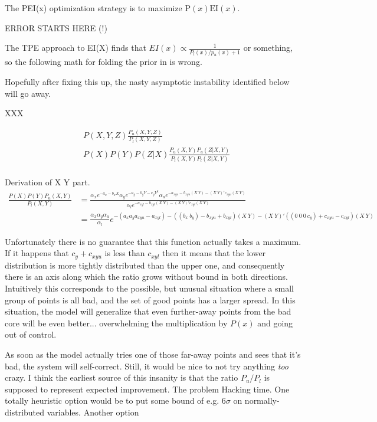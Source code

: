 \documentclass{article}
\begin{document}
The PEI(x) optimization strategy is to maximize $\mathrm{P}(x) \mathrm{EI}(x)$.

ERROR STARTS HERE (!)

The TPE approach to EI(X) finds that $EI(x) \propto \frac{1}{P_l(x)/p_u(x) + 1}$ or something,
so the following math for folding the prior in is wrong.

Hopefully after fixing this up, the nasty asymptotic instability identified below will go away.

XXX

\begin{align}
    & P(X, Y, Z)\frac{P_u(X, Y, Z)}{P_l(X, Y, Z)}\\
    & P(X) P(Y) P(Z|X) \frac{P_u(X, Y) P_u(Z|X, Y)}{P_l(X, Y) P_l(Z|X, Y)} \\
\end{align}

Derivation of X Y part.
\begin{align}
    \frac{P(X) P(Y) P_u(X, Y)}{P_l(X, Y)}
    &= \frac{
        \alpha_{x} e^{-a_{x} - b_{x}X}
        \alpha_{y} e^{-a_{y} - b_{y}Y - c_{y}Y^2}
        \alpha_u e^{ -a_{xyu} -b_{xyu} (X~Y) -(X~Y)'c_{xyu}(X~Y)}
    }{
        \alpha_l e^{ -a_{xyl} -b_{xyl} (X~Y) -(X~Y)'c_{xyl}(X~Y)}
    } \\
    &= \frac{ \alpha_{x} \alpha_{y} \alpha_u }{ \alpha_l }
    e^{ - (a_{x} a_{y} a_{xyu} -a_{xyl})
        - ((b_{x}~ b_{y}) - b_{xyu} + b_{xyl})(X~Y)
        - (X~Y)'((0~0~0~c_y) + c_{xyu} - c_{xyl})(X~Y)
    }
\end{align}

Unfortunately there is no guarantee that this function actually takes a maximum. If it happens that $c_y + c_{xyu}$ is less than $c_{xyl}$ then it means that the lower distribution is more tightly distributed than the upper one, and consequently there is an axis along which the ratio grows without bound in both directions.
Intuitively this corresponds to the possible, but unusual situation where a small group of points is all bad, and the set of good points has a larger spread. In this situation, the model will generalize that even further-away points from the bad core will be even better... overwhelming the multiplication by $P(x)$ and going out of control.

As soon as the model actually tries one of those far-away points and sees that it's bad, the system will self-correct. Still, it would be nice to not try anything {\em too} crazy.
I think the earliest source of this insanity is that the ratio $P_u / P_l$ is supposed to represent expected improvement.
The problem 
Hacking time.
One totally heuristic option would be to put some bound of e.g. 6$\sigma$ on normally-distributed variables.
Another option
\end{document}
